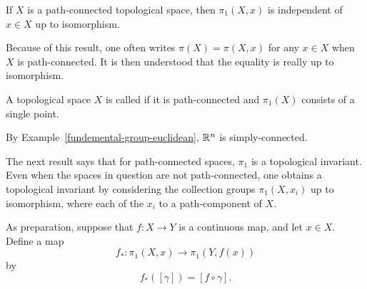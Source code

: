 \begin{cor}
  If $X$ is a path-connected topological space, then $\pi_1(X,x)$ is independent of $x \in X$ up to isomorphism.
\end{cor}
Because of this result, one often writes $\pi(X) = \pi(X,x)$ for any $x \in X$ when $X$ is path-connected. It is then understood that the equality is really up to isomorphism.
\begin{defn}
  A topological space $X$ is called  if it is path-connected and $\pi_1(X)$ consists of a single point.
\end{defn}
\begin{example}
  By Example~\ref{fundemental-group-euclidean}, $\mathbb{R}^n$ is simply-connected.
\end{example}

The next result says that for path-connected spaces, $\pi_1$ is a topological invariant. Even when the spaces in question are not path-connected, one obtains a topological invariant by considering the collection groups $\pi_1(X,x_i)$ up to isomorphism, where each of the $x_i$ to a path-component of $X$.

As preparation, suppose that $f : X \to Y$ is a continuous map, and let $x \in X$. Define a map
\[
  f_* : \pi_1(X,x) \to \pi_1(Y,f(x))
\]
by
\[
  f_*([\gamma]) = [f \circ \gamma].
\]

